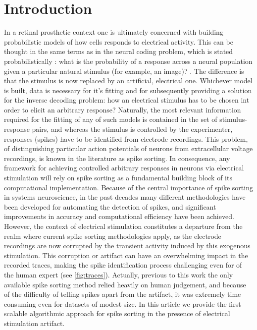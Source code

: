 \documentclass[12pt,letterpaper,fleqn]{article}
\begin{document}
\section{Introduction}
In a retinal prosthetic context one is ultimately concerned with building probabilistic models of how cells responds to electrical activity. This can be thought in the same terms as in the neural coding problem, which is stated probabilistically : what is the probability of a response across a neural population given a particular natural stimulus (for example, an image)? \cite{Paninski04}. The difference is that the stimulus is now replaced by an artificial, electrical one. Whichever model is built, data is necessary for it's fitting and for subsequently providing a solution for the inverse decoding problem: how an electrical stimulus has to be chosen int order to elicit an arbitrary response? Naturally, the most relevant information required for the fitting of any of such models is contained in the set of stimulus-response pairs, and whereas the stimulus is controlled by the experimenter, responses (spikes) have to be identified from electrode recordings. This problem, of distinguishing particular action potentials of neurons from extracellular voltage recordings, is known in the literature as spike sorting. In consequence, any framework for achieving controlled arbitrary responses in neurons via electrical stimulation will rely on spike sorting as a fundamental building block of its computational implementation. Because of the central importance of spike sorting in systems neuroscience, in the past decades many different methodologies have been developed for automating the detection of spikes, and significant improvements in accuracy and computational efficiency have been achieved\cite{Lewicki98,PillowEtal13,EkanadhamEtal14,Rey15}. However, the context of electrical stimulation constitutes a departure from the realm where current spike sorting methodologies apply, as the electrode recordings are now corrupted by the transient activity induced by this exogenous stimulation. This corruption or artifact can have an overwhelming impact in the recorded traces, making the spike identification process challenging even for of the human expert (see \ref{fig:traces}). Actually, previous to this work the only available spike sorting method relied heavily on human judgement, and because of the difficulty of telling spikes apart from the artifact, it was extremely time consuming even for datasets of modest size. In this article we provide the first scalable algorithmic approach for spike sorting in the presence of electrical stimulation artifact.
\end{document}
